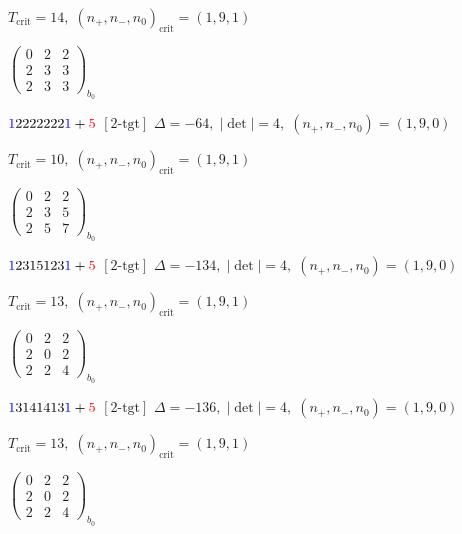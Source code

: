 \documentclass[10pt]{article}
\begin{document}
\hspace{1em}$T_{\text{crit}}=14,\; (n_+,n_-,n_0)_{\text{crit}}=(1,9,1)$

\hspace{2em}$\left(\begin{smallmatrix}0 & 2 & 2 \\ 2 & 3 & 3 \\ 2 & 3 & 3\end{smallmatrix}\right)_{\!b_0}$

\smallskip

$\textcolor{blue}{1}2222222\textcolor{blue}{1}+\textcolor{red}{5}$ $\scriptstyle [2\text{-tgt}]$ \quad $\Delta=-64,\; |\det|=4,\; (n_+,n_-,n_0)=(1,9,0)$

\hspace{1em}$T_{\text{crit}}=10,\; (n_+,n_-,n_0)_{\text{crit}}=(1,9,1)$

\hspace{2em}$\left(\begin{smallmatrix}0 & 2 & 2 \\ 2 & 3 & 5 \\ 2 & 5 & 7\end{smallmatrix}\right)_{\!b_0}$

\smallskip

$\textcolor{blue}{1}2315123\textcolor{blue}{1}+\textcolor{red}{5}$ $\scriptstyle [2\text{-tgt}]$ \quad $\Delta=-134,\; |\det|=4,\; (n_+,n_-,n_0)=(1,9,0)$

\hspace{1em}$T_{\text{crit}}=13,\; (n_+,n_-,n_0)_{\text{crit}}=(1,9,1)$

\hspace{2em}$\left(\begin{smallmatrix}0 & 2 & 2 \\ 2 & 0 & 2 \\ 2 & 2 & 4\end{smallmatrix}\right)_{\!b_0}$

\smallskip

$\textcolor{blue}{1}3141413\textcolor{blue}{1}+\textcolor{red}{5}$ $\scriptstyle [2\text{-tgt}]$ \quad $\Delta=-136,\; |\det|=4,\; (n_+,n_-,n_0)=(1,9,0)$

\hspace{1em}$T_{\text{crit}}=13,\; (n_+,n_-,n_0)_{\text{crit}}=(1,9,1)$

\hspace{2em}$\left(\begin{smallmatrix}0 & 2 & 2 \\ 2 & 0 & 2 \\ 2 & 2 & 4\end{smallmatrix}\right)_{\!b_0}$
\end{document}
